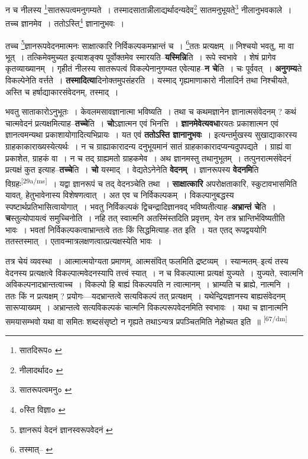 \documentclass[article,12pt,a4paper]{memoir}
\begin{document}
	न च नीलस्य \footnote{सातदिरूप० \cite{dp-msC}}सातरूपत्वमनुगम्यते । तस्मादसातान्नीलाद्यर्थादन्यदेव\footnote{नीलादर्थाद० \cite{dp-msC} \cite{dp-msD}} सातमनुभूयते\footnote{सातरूपत्वमनु० \cite{dp-msD}} नीलानुभवकाले । तच्च ज्ञानमेव । ततोऽस्ति\footnote{०स्ति विज्ञा० \cite{dp-msD}} ज्ञानानुभवः । 
	  
	तच्च \footnote{ज्ञानरूपं वेदनं \cite{dp-msA} \cite{dp-msB} \cite{dp-edP} \cite{dp-edH} \cite{dp-edE} \cite{dp-edN} ज्ञानस्वरूपवेदनं \cite{dp-msC} \cite{dp-msD}}ज्ञानरूपवेदनमात्मनः साक्षात्कारि निर्विकल्पकमभ्रान्तं च । \footnote{तस्मात्--\cite{dp-msA} \cite{dp-msB} \cite{dp-msC} \cite{dp-edP} \cite{dp-edE} \cite{dp-edH} \cite{dp-edN}}ततः प्रत्यक्षम् ॥ निश्चयो भवतु, मा वा भूत् । तत्किमेवमुच्यत इत्याशङ्क्य पूर्वोक्तमेव स्मारयति--\textbf{यस्मिन्नि}ति । रूपे स्वभावे । शेषं प्रागेव कृतव्याख्यानम् । गृहीतं नीलस्य सातरूपत्वं विकल्पेनानुगम्यत एवेत्याह--\textbf{न चे}ति । चः पूर्ववत् । \textbf{अनुगम्य}ते विकल्पेनेति वर्त्तते । \textbf{तस्मादित्या}दिनोक्तमुपसंहरति । यस्माद् गृह्यमाणाकारो नीलादिर्न तथा निश्चीयते, अस्ति च हर्षाद्याकारसंवेदनम्, तस्माद् ।
	\pend
      

	  \pstart भवतु साताकारोऽनुभूतः । केवलमसावज्ञानात्मा भविष्यति । तथा च कथमज्ञानेन ज्ञानात्मसंवेदनम् ? कथं चात्मवेदनं प्रत्यक्षमित्याह--\textbf{तच्चे}ति । \textbf{चो}ऽज्ञात्मन एवं भिनत्ति । \textbf{ज्ञानमेवेत्यवधा}रयतः प्रकाशात्मन एवं ज्ञानत्वमन्यथा प्रकाशायोगादित्यभिप्रायः । यत एवं \textbf{ततोऽस्ति ज्ञानानुभवः} । इत्यन्तर्मुखस्य सुखाद्याकारस्य ग्राहकाकाराख्यस्येत्यर्थः । न च ग्राह्याकारादन्य दनुभूयमानं सातं ग्राहकाकारादप्यन्यदुपपद्यते । ग्राह्यं वा प्रकाशेत, ग्राहकं वा । न च तद् ग्राह्यमतो ग्राहकमेव । अथ ज्ञानमस्तु तथानुभूतम् । तत्पुनरात्मसंवेदनं प्रत्यक्षं कुत इत्याह--\textbf{तच्चे}ति । \textbf{चो} यस्माद् । वेद्यतेऽनेनेति \textbf{वेदनम्} । ज्ञानरूपस्य \textbf{वेदनमि}ति विग्रहः\leavevmode\textsuperscript{\rmlatinfont\tiny [29a/ms]} । यद्वा ज्ञानरूपं च तद् वेदनञ्चेति तथा । \textbf{साक्षात्कारि} अपरोक्षताकारि, स्कुटावभासमिति यावत्, हेतुभावेनास्य विशेषणत्वात् । अत एव च निर्विकल्पकम् । विकल्पानुबद्धस्य स्पष्टार्थप्रतिभासित्वायोगात् । भवतु निर्विकल्पकं द्विचन्द्रादिज्ञानवद् भविष्यतीत्याह--\textbf{अभ्रान्तं चे}ति । \textbf{च}स्तुल्योपायत्वं समुच्चिनोति । नहि तत् स्वात्मनि अतस्मिंस्तदिति प्रवृत्तम्, येन तत्र भ्रान्तिर्भविष्यतीति भावः । भवतां निर्विकल्पकत्वाभ्रान्तत्वे ततः किं सिद्धमित्याह--तत इति । यत एतद् रूपद्वययोगि ततस्तस्मात् । एतावन्मात्रलक्षणत्वात्प्रत्यक्षस्येति भावः ।
	\pend
      

	  \pstart तत्र चेयं व्यवस्था । आत्मात्मयोग्यता प्रमाणम्, आत्मसंवित् फलमिति द्रष्टव्यम् । स्यान्मतम्--इत्यं तस्य वेदनस्य प्रत्यक्षत्वे विकल्पात्मवेदनस्यापि तत्त्वं स्यात् । न च विकल्पात्मा प्रत्यक्षं युज्यते । युज्यते, स्वात्मनि अविकल्पनादभ्रान्तत्वाच्च । विकल्पो हि बाह्यं विकल्पयति न त्वात्मानम् । भ्राम्यति च ब्राह्ये, नात्मनि । ततः किं न प्रत्यक्षम् ? प्रयोगः—यदभ्रान्तत्वे सत्यविकल्पं तत् प्रत्यक्षम् । यथेन्द्रियज्ञानस्य बाह्यसंवेदनम् सारूप्याख्यम् । अभ्रान्तत्वे सत्यविकल्पकं चात्मनि विकल्परूपवेदनमिति स्वभावः । यथा च ज्ञानात्मनि समयासम्भवो यथा वा समितः शब्दसंसृष्टो न गृह्यते तथाऽन्यत्र प्रपञ्चितमिति नेहोच्यत इति ॥
	\pend
      \leavevmode\textsuperscript{\rmlatinfont\tiny [67/dm]}
\end{document}
